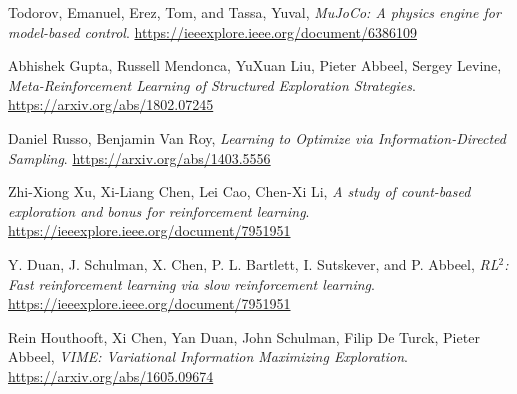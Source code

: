 \documentclass[conference]{IEEEtran}
\begin{document}
\begin{thebibliography}{1}
		Todorov, Emanuel, Erez, Tom, and Tassa, Yuval, \emph{MuJoCo: A physics engine for model-based control}.
		\url{https://ieeexplore.ieee.org/document/6386109}
		
		Abhishek Gupta, Russell Mendonca, YuXuan Liu, Pieter Abbeel, Sergey Levine, \emph{Meta-Reinforcement Learning of Structured Exploration Strategies}.
		\url{https://arxiv.org/abs/1802.07245}
		
		Daniel Russo, Benjamin Van Roy, \emph{Learning to Optimize via Information-Directed Sampling}.
		\url{https://arxiv.org/abs/1403.5556}
		
		Zhi-Xiong Xu, Xi-Liang Chen, Lei Cao, Chen-Xi Li, \emph{A study of count-based exploration and bonus for reinforcement learning}.
		\url{https://ieeexplore.ieee.org/document/7951951}
		
		Y. Duan, J. Schulman, X. Chen, P. L. Bartlett, I. Sutskever, and P. Abbeel, \emph{RL$^2$: Fast reinforcement learning via slow reinforcement learning}.
		\url{https://ieeexplore.ieee.org/document/7951951}
		
		Rein Houthooft, Xi Chen, Yan Duan, John Schulman, Filip De Turck, Pieter Abbeel, \emph{VIME: Variational Information Maximizing Exploration}.
		\url{https://arxiv.org/abs/1605.09674}
		
	\end{thebibliography}
	
	
	
	
\end{document}
